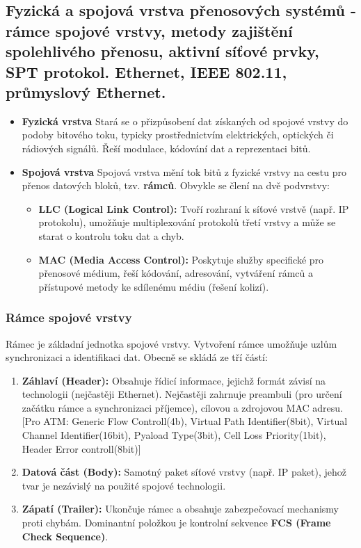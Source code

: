     \subsection{Fyzická a spojová vrstva přenosových systémů - rámce spojové vrstvy, metody zajištění spolehlivého přenosu, aktivní síťové prvky, SPT protokol. Ethernet, IEEE 802.11, průmyslový Ethernet.}
        \begin{itemize}
            \item\textbf{Fyzická vrstva} Stará se o přizpůsobení dat získaných od spojové vrstvy do podoby bitového toku, typicky prostřednictvím elektrických, optických či rádiových signálů. Řeší modulace, kódování dat a reprezentaci bitů.
            \item\textbf{Spojová vrstva} Spojová vrstva mění tok bitů z fyzické vrstvy na cestu pro přenos datových bloků, tzv. \textbf{rámců}. Obvykle se člení na dvě podvrstvy:
            \begin{itemize}
                \item \textbf{LLC (Logical Link Control):} Tvoří rozhraní k síťové vrstvě (např. IP protokolu), umožňuje multiplexování protokolů třetí vrstvy a může se starat o kontrolu toku dat a chyb.
                \item \textbf{MAC (Media Access Control):} Poskytuje služby specifické pro přenosové médium, řeší kódování, adresování, vytváření rámců a přístupové metody ke sdílenému médiu (řešení kolizí).
            \end{itemize}
        \end{itemize}

    \subsubsection{Rámce spojové vrstvy}
        Rámec je základní jednotka spojové vrstvy. Vytvoření rámce umožňuje uzlům synchronizaci a identifikaci dat. Obecně se skládá ze tří částí:
        \begin{enumerate}
            \item \textbf{Záhlaví (Header):} Obsahuje řídicí informace, jejichž formát závisí na technologii (nejčastěji Ethernet). Nejčastěji zahrnuje preambuli (pro určení začátku rámce a synchronizaci příjemce), cílovou a zdrojovou MAC adresu. [Pro ATM: Generic Flow Controll(4b), Virtual Path Identifier(8bit), Virtual Channel Identifier(16bit), Pyaload Type(3bit), Cell Loss Priority(1bit), Header Error controll(8bit)]
            \item \textbf{Datová část (Body):} Samotný paket síťové vrstvy (např. IP paket), jehož tvar je nezávislý na použité spojové technologii.
            \item \textbf{Zápatí (Trailer):} Ukončuje rámec a obsahuje zabezpečovací mechanismy proti chybám. Dominantní položkou je kontrolní sekvence \textbf{FCS (Frame Check Sequence)}.
        \end{enumerate}

